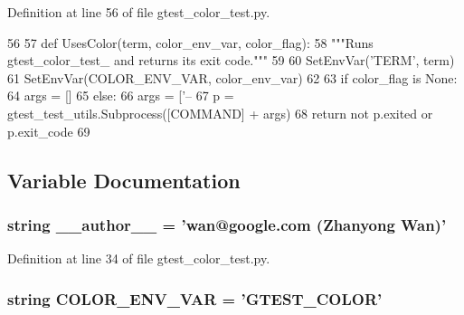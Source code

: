 \-Definition at line 56 of file gtest\-\_\-color\-\_\-test.\-py.


\begin{DoxyCode}
56 
57 def UsesColor(term, color_env_var, color_flag):
58   """Runs gtest_color_test_ and returns its exit code."""
59 
60   SetEnvVar('TERM', term)
61   SetEnvVar(COLOR_ENV_VAR, color_env_var)
62 
63   if color_flag is None:
64     args = []
65   else:
66     args = ['--%
67   p = gtest_test_utils.Subprocess([COMMAND] + args)
68   return not p.exited or p.exit_code
69 

\end{DoxyCode}


\subsection{\-Variable \-Documentation}
\hypertarget{namespacegtest__color__test_a629d61dfe4da763164a4d1a2d85b0afd}{
\subsubsection[{\-\_\-\-\_\-author\-\_\-\-\_\-}]{\setlength{\rightskip}{0pt plus 5cm}string {\bf \-\_\-\-\_\-author\-\_\-\-\_\-} = 'wan@google.\-com (\-Zhanyong \-Wan)'}}\label{dd/dee/namespacegtest__color__test_a629d61dfe4da763164a4d1a2d85b0afd}


\-Definition at line 34 of file gtest\-\_\-color\-\_\-test.\-py.

\hypertarget{namespacegtest__color__test_a162b19458831d7c0d493de2abd006748}{
\subsubsection[{\-C\-O\-L\-O\-R\-\_\-\-E\-N\-V\-\_\-\-V\-A\-R}]{\setlength{\rightskip}{0pt plus 5cm}string {\bf \-C\-O\-L\-O\-R\-\_\-\-E\-N\-V\-\_\-\-V\-A\-R} = '\-G\-T\-E\-S\-T\-\_\-\-C\-O\-L\-O\-R'}}\label{dd/dee/namespacegtest__color__test_a162b19458831d7c0d493de2abd006748}


